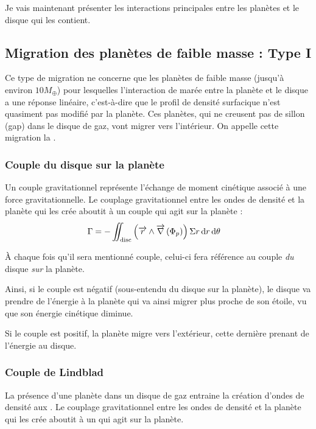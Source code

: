 Je vais maintenant présenter les interactions principales entre les planètes et le disque qui les contient. 

\subsection{Migration des planètes de faible masse : Type I}
Ce type de migration ne concerne que les planètes de faible masse (jusqu'à environ $10M_{\oplus}$) pour lesquelles l'interaction de marée entre la planète et le disque a une réponse linéaire, c'est-à-dire que le profil de densité surfacique n'est quasiment pas modifié par la planète. Ces planètes, qui ne creusent pas de sillon (gap) dans le disque de gaz, vont migrer vers l'intérieur. On appelle cette migration la .


\subsubsection{Couple du disque sur la planète}
Un couple gravitationnel représente l'échange de moment cinétique associé à une force gravitationnelle.  Le couplage gravitationnel entre
les ondes de densité et la planète qui les crée aboutit à un couple qui agit sur la planète : 
\begin{align}
\Gamma &= - \iint_\text{disc} \left({\overrightarrow{r}}\wedge{\overrightarrow{\nabla}} \left( \Phi_p\right)\right)\Sigma r \operatorname{d \!} r \operatorname{d \!} \theta
\end{align}

À chaque fois qu'il sera mentionné \og couple\fg, celui-ci fera référence au couple \emph{du} disque \emph{sur} la planète.

Ainsi, si le couple est négatif (sous-entendu du disque sur la planète), le disque va prendre de l'énergie à la planète qui va ainsi migrer plus proche de son étoile, vu que son énergie cinétique diminue.

Si le couple est positif, la planète migre vers l'extérieur, cette dernière prenant de l'énergie au disque.

\subsubsection{Couple de Lindblad}
La présence d'une planète dans un disque de gaz entraine la création d'ondes de densité aux  \citep{goldreich1979excitation}. Le couplage gravitationnel entre les ondes de densité et la
planète qui les crée aboutit à un  qui agit sur la planète.

